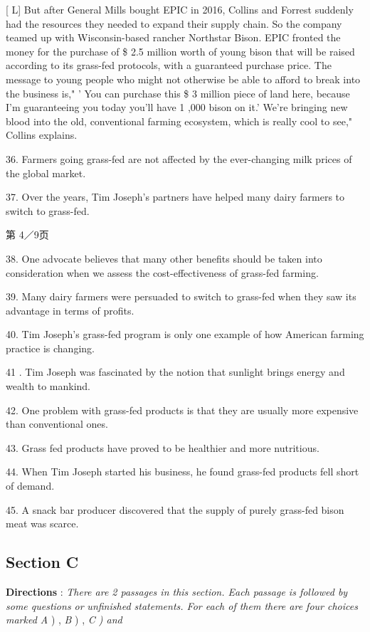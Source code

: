 \documentclass[UTF8,11pt]{ctexart}
\begin{document}
[ L] But after General Mills bought EPIC in 2016, Collins and Forrest suddenly had the resources they needed to expand their supply chain. So the company teamed up with Wisconsin-based rancher Northstar Bison. EPIC fronted the money for the purchase of \$ 2.5 million worth of young bison that will be raised according to its grass-fed protocols, with a guaranteed purchase price. The message to young people who might not otherwise be able to afford to break into the business is," ' You can purchase this \$ 3 million piece of land here, because I'm guaranteeing you today you'll have 1 ,000 bison on it.' We're bringing new blood into the old, conventional farming ecosystem, which is really cool to see," Collins explains.


36. Farmers going grass-fed are not affected by the ever-changing milk prices of the global market.


37. Over the years, Tim Joseph's partners have helped many dairy farmers to switch to grass-fed.


第 4／9页


38. One advocate believes that many other benefits should be taken into consideration when we assess the cost-effectiveness of grass-fed farming.


39. Many dairy farmers were persuaded to switch to grass-fed when they saw its advantage in terms of profits.


40. Tim Joseph's grass-fed program is only one example of how American farming practice is changing.


41 . Tim Joseph was fascinated by the notion that sunlight brings energy and wealth to mankind.


42. One problem with grass-fed products is that they are usually more expensive than conventional ones.


43. Grass fed products have proved to be healthier and more nutritious.


44. When Tim Joseph started his business, he found grass-fed products fell short of demand.


45. A snack bar producer discovered that the supply of purely grass-fed bison meat was scarce.


\subsection*{\textbf{Section C}}


\textbf{Directions }: \textit{There are 2 passages in this section. Each passage is followed by some questions or} \textit{unfinished statements. For each of them there are four choices marked A }) , \textit{B }) , \textit{C ) and}
\end{document}
